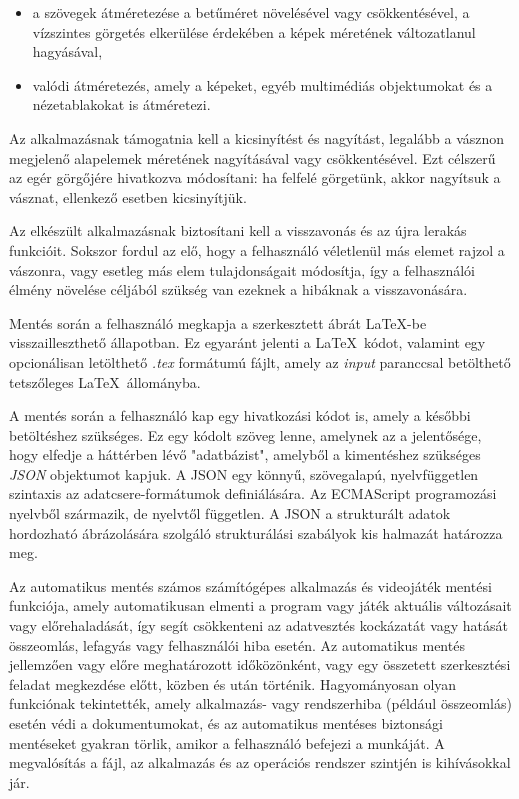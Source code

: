 \begin{itemize}
	\item a szövegek átméretezése a betűméret növelésével vagy csökkentésével, a vízszintes görgetés elkerülése érdekében a képek méretének változatlanul hagyásával,
	\item valódi átméretezés, amely a képeket, egyéb multimédiás objektumokat és a nézetablakokat is átméretezi.
\end{itemize}

Az alkalmazásnak támogatnia kell a kicsinyítést és nagyítást, legalább a vásznon megjelenő alapelemek méretének nagyításával vagy csökkentésével. Ezt célszerű az egér görgőjére hivatkozva módosítani: ha felfelé görgetünk, akkor nagyítsuk a vásznat, ellenkező esetben kicsinyítjük.


Az elkészült alkalmazásnak biztosítani kell a visszavonás és az újra lerakás funkcióit. Sokszor fordul az elő, hogy a felhasználó véletlenül más elemet rajzol a vászonra, vagy esetleg más elem tulajdonságait módosítja, így a felhasználói élmény növelése céljából szükség van ezeknek a hibáknak a visszavonására.



Mentés során a felhasználó megkapja a szerkesztett ábrát \LaTeX-be visszailleszthető állapotban. Ez egyaránt jelenti a \LaTeX\ kódot, valamint egy opcionálisan letölthető \textit{.tex} formátumú fájlt, amely az \textit{input} paranccsal betölthető tetszőleges \LaTeX\ állományba.

A mentés során a felhasználó kap egy hivatkozási kódot is, amely a későbbi betöltéshez szükséges. Ez egy kódolt szöveg lenne, amelynek az a jelentősége, hogy elfedje a háttérben lévő "adatbázist", amelyből a kimentéshez szükséges \textit{JSON} \cite{json} objektumot kapjuk. A JSON egy könnyű, szövegalapú, nyelvfüggetlen szintaxis az adatcsere-formátumok definiálására. Az ECMAScript \cite{ecmascript} programozási nyelvből származik, de nyelvtől független. A JSON a strukturált adatok hordozható ábrázolására szolgáló strukturálási szabályok kis halmazát határozza meg.


Az automatikus mentés számos számítógépes alkalmazás és videojáték mentési funkciója, amely automatikusan elmenti a program vagy játék aktuális változásait vagy előrehaladását, így segít csökkenteni az adatvesztés kockázatát vagy hatását összeomlás, lefagyás vagy felhasználói hiba esetén. Az automatikus mentés jellemzően vagy előre meghatározott időközönként, vagy egy összetett szerkesztési feladat megkezdése előtt, közben és után történik. Hagyományosan olyan funkciónak tekintették, amely alkalmazás- vagy rendszerhiba (például összeomlás) esetén védi a dokumentumokat, és az automatikus mentéses biztonsági mentéseket gyakran törlik, amikor a felhasználó befejezi a munkáját. A megvalósítás a fájl, az alkalmazás és az operációs rendszer szintjén is kihívásokkal jár.


